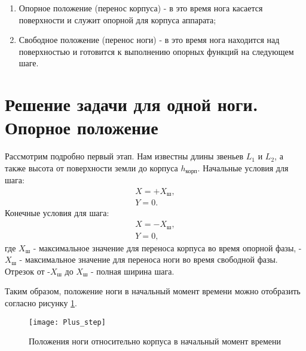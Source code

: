 \begin{enumerate} 
	\item Опорное положение (перенос корпуса) - в это время нога касается поверхности и служит опорной для корпуса аппарата;
	\item Свободное положение (перенос ноги) - в это время нога находится над поверхностью и готовится к выполнению опорных функций на следующем шаге.
\end{enumerate}

\section{Решение задачи для одной ноги. Опорное положение}\label{C3_2}
Рассмотрим подробно первый этап. Нам известны длины звеньев $L_{1}$ и $L_{2}$, а также высота от поверхности земли до корпуса $h_{\text{корп}}$. 
Начальные условия для шага:
\begin{equation}
	\begin{array}{l}
		X = +X_{\text{ш}},
		\\
		Y = 0.
	\end{array}
\end{equation}
Конечные условия для шага:
\begin{equation}
	\begin{array}{l}
		X = -X_{\text{ш}},
		\\
		Y = 0,
	\end{array}
	\label{gran_step}
\end{equation}
где $X_{\text{ш}}$ - максимальное значение для переноса корпуса во время опорной фазы, -$X_{\text{ш}}$ - максимальное значение для переноса ноги во время свободной фазы. Отрезок от -$X_{\text{ш}}$ до $X_{\text{ш}}$ - полная ширина шага.  

Таким образом, положение ноги в начальный момент времени можно отобразить согласно рисунку \ref{Plus_step}.
\newline
\begin{figure}[h]
	\begin{center}
		\texttt{[image: Plus\_step]}
		\caption{Положения ноги относительно корпуса в начальный момент времени}
		\label{Plus_step}
	\end{center}
\end{figure}

